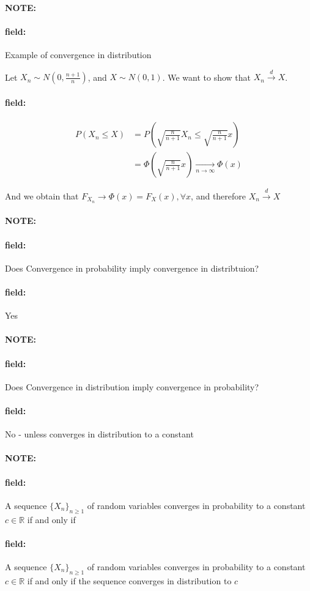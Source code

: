 \documentclass[12pt]{article}
\newenvironment{note}{\paragraph{NOTE:}}{}
\newenvironment{field}{\paragraph{field:}}{}
\begin{document}
\begin{note}
  \begin{field}
    Example of convergence in distribution

    Let $X_n \sim N(0, \frac{n+1}{n})$, and $X \sim N(0,1)$. We want to show that $X_n \overset{d}{\to} X$.
  \end{field}
  \begin{field}
    \begin{align*}
      P(X_n \leq X) &= P(\sqrt{\frac{n}{n + 1}}X_n \leq \sqrt{\frac{n}{n+1}}x)\\
      &= \Phi(\sqrt{\frac{n}{n + 1}}x) \underset{n \to \infty}{\to} \Phi(x)
    \end{align*}

    And we obtain that $F_{X_n} \to \Phi(x) = F_X(x), \forall x$, and therefore $X_n \overset{d}{\to} X$
  \end{field}
\end{note}


\begin{note}
  \begin{field}
    Does Convergence in probability imply convergence in distribtuion?
  \end{field}
  \begin{field}
    Yes
  \end{field}
\end{note}

\begin{note}
  \begin{field}
    Does Convergence in distribution imply convergence in probability?
  \end{field}
  \begin{field}
    No - unless converges in distribution to a constant
  \end{field}
\end{note}

\begin{note}
  \begin{field}
    A sequence $\{X_n\}_{n \geq 1}$ of random variables converges in probability to a constant $c \in \mathbb{R}$ if and only if
  \end{field}
  \begin{field}
    A sequence $\{X_n\}_{n \geq 1}$ of random variables converges in probability to a constant $c \in \mathbb{R}$ if and only if the sequence converges in distribution to $c$
  \end{field}
\end{note}
\end{document}
